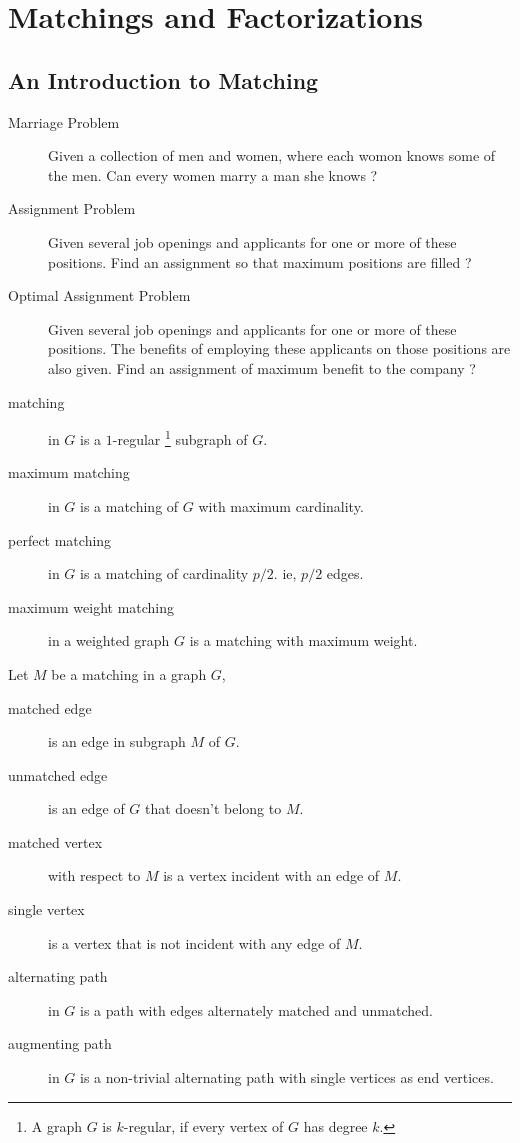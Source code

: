 \section{Matchings and Factorizations}
\subsection{An Introduction to Matching}
\begin{description}
	\item[Marriage Problem] Given a collection of men and women, where each womon knows some of the men.
		Can every women marry a man she knows ?
	\item[Assignment Problem] Given several job openings and applicants for one or more of these positions.
		Find an assignment so that maximum positions are filled ?
	\item[Optimal Assignment Problem] Given several job openings and applicants for one or more of these positions.
		The benefits of employing these applicants on those positions are also given.
		Find an assignment of maximum benefit to the company ?
\end{description}

\begin{description}
	\item[matching] in $G$ is a $1$-regular
		\footnote{
			A graph $G$ is $k$-regular, if every vertex of $G$ has degree $k$.
			} subgraph of $G$.
	\item[maximum matching] in $G$ is a matching of $G$ with maximum cardinality.
	\item[perfect matching] in $G$ is a matching of cardinality $p/2$.
		ie, $p/2$ edges.
	\item[maximum weight matching] in a weighted graph $G$ is a matching with maximum weight.
\end{description}

\begin{definition}
	Let $M$ be a matching in a graph $G$,
	\begin{description}
		\item[matched edge] is an edge in subgraph $M$ of $G$.
		\item[unmatched edge] is an edge of $G$ that doesn't belong to $M$.
		\item[matched vertex] with respect to $M$ is a vertex incident with an edge of $M$.
		\item[single vertex] is a vertex that is not incident with any edge of $M$.
		\item[alternating path] in $G$ is a path with edges alternately matched and unmatched.
		\item[augmenting path] in $G$ is a non-trivial alternating path with single vertices as end vertices.
	\end{description}
\end{definition}

